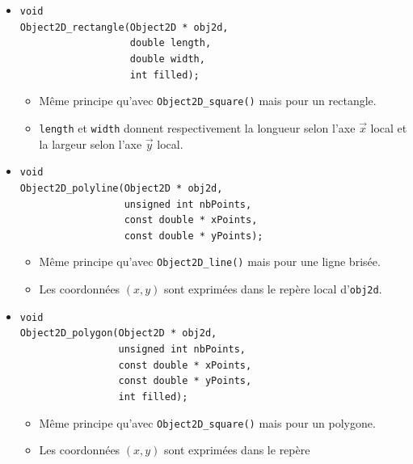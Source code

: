 \documentclass[12pt]{article}
\begin{document}
\begin{itemize}
\begin{itemize}
      \end{itemize}
\item \verb!void! \\
      \verb!Object2D_rectangle(Object2D * obj2d,! \\
      \verb!                   double length,! \\
      \verb!                   double width,! \\
      \verb!                   int filled);!
      \begin{itemize}
      \item M\^eme principe qu'avec \verb!Object2D_square()! mais pour
            un rectangle.
      \item \verb!length! et \verb!width! donnent respectivement la longueur
            selon l'axe $\vec{x}$ local et la largeur selon l'axe $\vec{y}$
            local.
      \end{itemize}
\item \verb!void! \\
      \verb!Object2D_polyline(Object2D * obj2d,! \\
      \verb!                  unsigned int nbPoints,! \\
      \verb!                  const double * xPoints,! \\
      \verb!                  const double * yPoints);!
      \begin{itemize}
      \item M\^eme principe qu'avec \verb!Object2D_line()! mais pour
            une ligne bris\'ee.
      \item Les coordonn\'ees $(x,y)$ sont exprim\'ees dans le rep\`ere
            local d'\verb!obj2d!.
      \end{itemize}
\item \verb!void! \\
      \verb!Object2D_polygon(Object2D * obj2d,! \\
      \verb!                 unsigned int nbPoints,! \\
      \verb!                 const double * xPoints,! \\
      \verb!                 const double * yPoints,! \\
      \verb!                 int filled);!
      \begin{itemize}
      \item M\^eme principe qu'avec \verb!Object2D_square()! mais pour
            un polygone.
      \item Les coordonn\'ees $(x,y)$ sont exprim\'ees dans le rep\`ere

\end{itemize}
\end{itemize}
\end{document}
